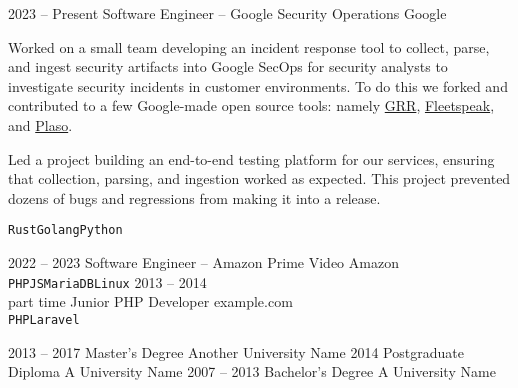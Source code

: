\documentclass[9pt]{developercv} %
\begin{document}
\begin{entrylist}
  \entry
  {2023 -- Present}
  {Software Engineer -- Google Security Operations}
  {Google}
  {Worked on a small team developing an incident response tool to collect,
    parse, and ingest security artifacts into Google SecOps for security
    analysts to investigate security incidents in customer environments. To do
    this we forked and contributed to a few Google-made open source tools:
    namely \href{https://github.com/google/grr}{GRR},
    \href{https://github.com/google/fleetspeak}{Fleetspeak}, and
    \href{https://github.com/log2timeline/plaso}{Plaso}.

		Led a project building an end-to-end testing platform for our services,
		ensuring that collection, parsing, and ingestion worked as expected. This
		project prevented dozens of bugs and regressions from making it into a
		release.

  \texttt{Rust}\slashsep\texttt{Golang}\slashsep\texttt{Python}}
  \entry
  {2022 -- 2023}
  {Software Engineer -- Amazon Prime Video}
  {Amazon}
  {\lorem\lorem\\ \texttt{PHP}\slashsep\texttt{JS}\slashsep\texttt{MariaDB}\slashsep\texttt{Linux}}
  \entry
  {2013 -- 2014\\\footnotesize{part time}}
  {Junior PHP Developer}
  {example.com}
  {\lorem\lorem\\ \texttt{PHP}\slashsep\texttt{Laravel}}
\end{entrylist}



\begin{entrylist}
  \entry
  {2013 -- 2017}
  {Master's Degree}
  {Another University Name}
  {\lorem\lorem\lorem}
  \entry
  {2014}
  {Postgraduate Diploma}
  {A University Name}
  {\lorem\lorem}
  \entry
  {2007 -- 2013}
  {Bachelor's Degree}
  {A University Name}
  {\lorem\lorem}
\end{entrylist}

\end{document}
